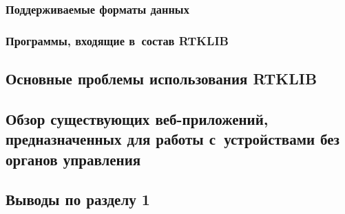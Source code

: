\subsubsection{Поддерживаемые форматы данных}
\subsubsection{Программы, входящие в~состав RTKLIB}

\subsection{Основные проблемы использования RTKLIB}

\subsection{Обзор существующих веб-приложений, предназначенных для работы с~устройствами без органов управления}

\subsection{Выводы по разделу 1}

\newpage

